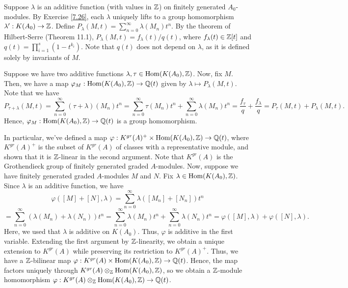 Suppose $\lambda$ is an additive function (with values in $\mathbb{Z}$) on finitely generated $A_0$-modules. By Exercise \ref{7.26},
each $\lambda$ uniquely lifts to a group homomorphism $\lambda' : K(A_0) \to \mathbb{Z}$. Define $P_{\lambda}(M,t) = \sum_{n=0}^{\infty}\lambda(M_n)t^n$.
By the theorem of Hilbert-Serre (Theorem 11.1), $P_{\lambda}(M,t) = f_{\lambda}(t)/q(t)$, where $f_{\lambda}(t) \in \mathbb{Z}[t]$ and 
$q(t) = \prod_{i=1}^s (1 - t^{k_i})$. Note that $q(t)$ does not depend on $\lambda$, as it is defined solely by invariants of $M$.

Suppose we have two additive functions $\lambda, \tau \in \operatorname{Hom}(K(A_0), \mathbb{Z})$. Now, fix $M$. Then, we have a map $\varphi_M : \operatorname{Hom}(K(A_0),\mathbb{Z}) \to \mathbb{Q}(t)$
given by $\lambda \mapsto P_{\lambda}(M,t)$. Note that we have
$$P_{\tau + \lambda}(M,t) = \sum_{n=0}^{\infty}(\tau + \lambda)(M_n)t^n = \sum_{n=0}^{\infty}\tau(M_n)t^n + \sum_{n=0}^{\infty}\lambda(M_n)t^n 
= \frac{f_{\tau}}{q} + \frac{f_{\lambda}}{q} = P_{\tau}(M,t) + P_{\lambda}(M,t).$$
Hence, $\varphi_M : \operatorname{Hom}(K(A_0), \mathbb{Z}) \to \mathbb{Q}(t)$ is a group homomorphism.

In particular, we've defined a map $\varphi : K^{gr}(A)^+ \times \operatorname{Hom}(K(A_0), \mathbb{Z}) \to \mathbb{Q}(t)$, where $K^{gr}(A)^+$ is the subset of $K^{gr}(A)$ of classes with 
a representative module, and shown that it is $\mathbb{Z}$-linear in the second argument. Note that $K^{gr}(A)$ is the Grothendieck group of finitely generated graded
$A$-modules. Now, suppose we have finitely generated graded $A$-modules $M$ and $N$. Fix 
$\lambda \in \operatorname{Hom}(K(A_0), \mathbb{Z})$. Since $\lambda$ is an additive function, we have
$$\varphi([M] + [N], \lambda) = \sum_{n=0}^{\infty}\lambda([M_n] + [N_n])t^n$$
$$= \sum_{n=0}^{\infty}(\lambda(M_n)+\lambda(N_n))t^n = \sum_{n=0}^{\infty}\lambda(M_n)t^n + \sum_{n=0}^{\infty}\lambda(N_n)t^n
= \varphi([M], \lambda) + \varphi([N], \lambda).$$
Here, we used that $\lambda$ is additive on $K(A_0)$. Thus, $\varphi$ is additive in the first variable. Extending the first argument by $\mathbb{Z}$-linearity, we obtain a 
unique extension to $K^{gr}(A)$ while preserving
its restriction to $K^{gr}(A)^+$. Thus, we have a $\mathbb{Z}$-bilinear map $\varphi : K^{gr}(A) \times \operatorname{Hom}(K(A_0), \mathbb{Z}) \to \mathbb{Q}(t)$. Hence, the map factors uniquely
through $K^{gr}(A) \otimes_{\mathbb{Z}} \operatorname{Hom}(K(A_0), \mathbb{Z})$, so we obtain a $\mathbb{Z}$-module homomorphism $\varphi : K^{gr}(A) \otimes_{\mathbb{Z}} \operatorname{Hom}(K(A_0), \mathbb{Z}) \to \mathbb{Q}(t)$.

